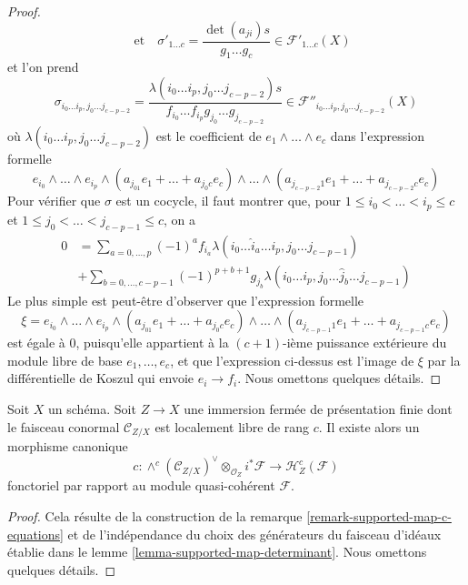 \begin{proof}
$$\quad\text{et}\quad
\sigma'_{1 \ldots c} = \frac{\det(a_{ji})s}{g_1 \ldots g_c} \in
\mathcal{F}'_{1 \ldots c}(X)
$$
et l'on prend
$$
\sigma_{i_0 \ldots i_p, j_0 \ldots j_{c - p - 2}} =
\frac{\lambda(i_0 \ldots i_p, j_0 \ldots j_{c - p - 2})s}%
{f_{i_0} \ldots f_{i_p}g_{j_0} \ldots g_{j_{c - p - 2}}}
\in \mathcal{F}''_{i_0 \ldots i_p, j_0 \ldots j_{c - p - 2}}(X)
$$
où $\lambda(i_0 \ldots i_p, j_0 \ldots j_{c - p - 2})$
est le coefficient de $e_1 \wedge \ldots \wedge e_c$ dans
l'expression formelle
$$
e_{i_0} \wedge \ldots \wedge e_{i_p} \wedge
(a_{j_01} e_1 + \ldots + a_{j_0c}e_c) \wedge \ldots \wedge
(a_{j_{c - p - 2}1} e_1 + \ldots + a_{j_{c - p - 2}c}e_c)
$$
Pour vérifier que $\sigma$ est un cocycle, il faut montrer que, pour
$1 \leq i_0 < \ldots < i_p \leq c$ et
$1 \leq j_0 < \ldots < j_{c - p - 1} \leq c$,
on a
\begin{align*}
0 & =
\sum\nolimits_{a = 0, \ldots, p} (-1)^a
f_{i_a} \lambda(i_0 \ldots \hat i_a \ldots i_p, j_0 \ldots j_{c - p - 1}) \\
& +
\sum\nolimits_{b = 0, \ldots, c - p - 1} (-1)^{p + b + 1}g_{j_b}
\lambda(i_0 \ldots i_p, j_0 \ldots \hat j_b \ldots j_{c - p - 1})
\end{align*}
Le plus simple est peut-être d'observer que l'expression formelle
$$
\xi = e_{i_0} \wedge \ldots \wedge e_{i_p} \wedge
(a_{j_01} e_1 + \ldots + a_{j_0c}e_c) \wedge \ldots \wedge
(a_{j_{c - p - 1}1} e_1 + \ldots + a_{j_{c - p - 1}c}e_c)
$$
est égale à $0$, puisqu'elle appartient à la $(c + 1)$-ième puissance extérieure du module libre
de base $e_1, \ldots, e_c$, et que l'expression ci-dessus est l'image de
$\xi$ par la différentielle de Koszul qui envoie $e_i \to f_i$. Nous omettons quelques
détails.
\end{proof}

\begin{lemma}
\label{lemma-supported-map-global}
Soit $X$ un schéma. Soit $Z \to X$ une immersion fermée de présentation finie
dont le faisceau conormal $\mathcal{C}_{Z/X}$ est localement libre de rang $c$.
Il existe alors un morphisme canonique
$$
c :
\wedge^c(\mathcal{C}_{Z/X})^\vee \otimes_{\mathcal{O}_Z} i^*\mathcal{F}
\longrightarrow
\mathcal{H}_Z^c(\mathcal{F})
$$
fonctoriel par rapport au module quasi-cohérent $\mathcal{F}$.
\end{lemma}

\begin{proof}
Cela résulte de la construction de la
remarque \ref{remark-supported-map-c-equations}
et de l'indépendance du choix
des générateurs du faisceau d'idéaux établie dans le
lemme \ref{lemma-supported-map-determinant}.
Nous omettons quelques détails.
\end{proof}

